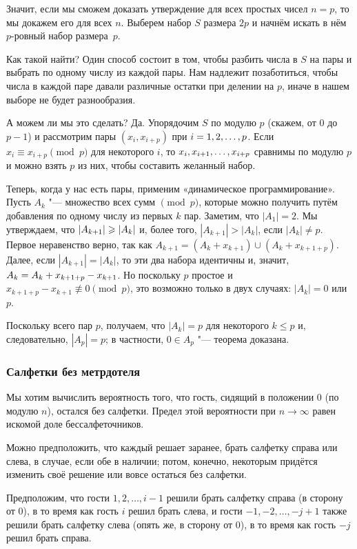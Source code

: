 \documentclass[twoside]{book}
\begin{document}
Значит, если мы сможем доказать утверждение для всех простых чисел $n=p$, то мы докажем его для всех $n$.
Выберем набор $S$ размера $2p$ и начнём искать в нём $p$-ровный набор размера~$p$.

Как такой найти?
Один способ состоит в том, чтобы разбить числа в $S$ на пары и выбрать по одному числу из каждой пары.
Нам  надлежит позаботиться, чтобы числа в каждой паре давали различные остатки при делении на $p$, иначе в нашем выборе не будет разнообразия. %

А можем ли мы это сделать?
Да.
Упорядочим $S$ по модулю $p$ (скажем, от $0$ до $p-1$) и рассмотрим пары $(x_i,x_{i+p})$ при $i\z=1,2,\dots, p$.
Если $x_i\equiv x_{i+p}\pmod p$ для некоторого $i$, то $x_i,x_{i+1},\z\dots,x_{i+p}$ сравнимы по модулю $p$ и можно взять $p$ из них, чтобы составить желанный набор.

Теперь, когда у нас есть пары, применим «динамическое программирование».
Пусть $A_k$ "--- множество всех сумм $\pmod p$, которые можно получить путём добавления по одному числу из первых $k$ пар.
Заметим, что $|A_1|= 2$.
Мы утверждаем, что $|A_{k+1}|\z\ge|A_k|$ и, более того, $|A_{k+1}|>|A_k|$, если $|A_k|\ne p$.
Первое неравенство верно, так как $A_{k+1} = (A_k+x_{k+1}) \cup (A_k+x_{k+1+p})$.
Далее, если $|A_{k+1}|=|A_k|$, то эти два набора идентичны и, значит,  $A_k \z= A_k+x_{k+1+p}-x_{k+1}$.
Но поскольку $p$ простое и $x_{k+1+p}-x_{k+1}\not\equiv 0\pmod p$, это возможно только в двух случаях: $|A_k|= 0$ или $p$.

Поскольку всего пар $p$, получаем, что $|A_k|= p$ для некоторого $k \le p$ и, следовательно, $|A_p|= p$; в частности, $0\in A_p$ "--- теорема доказана.
\heart

\subsubsection*{Салфетки без метрдотеля}

Мы хотим вычислить вероятность того, что гость, сидящий в положении 0 (по модулю $n$), остался без салфетки.
Предел этой вероятности при $n\to\infty$ равен искомой доле бессалфеточников.

Можно предположить, что каждый решает заранее, брать салфетку справа или слева, в случае, если обе в наличии;
потом, конечно, некоторым придётся изменить своё решение или вовсе остаться без салфетки.

Предположим, что гости $1,2,\dots, i - 1$ решили брать салфетку справа  (в сторону от 0), в то время как гость $i$ решил брать слева,
и гости $-1,-2,\dots, -j + 1$ также решили брать салфетку слева (опять же, в сторону от 0), в то время как гость $-j$ решил брать справа.
\end{document}
